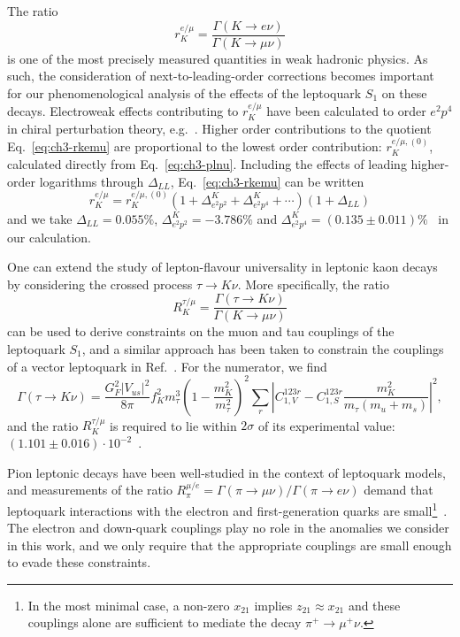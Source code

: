 The ratio
\begin{equation} \label{eq:ch3-rkemu}
  r_K^{e/\mu} = \frac{\Gamma(K \to e \nu)}{\Gamma(K \to \mu \nu)}
\end{equation}
is one of the most precisely measured quantities in weak hadronic physics. As
such, the consideration of next-to-leading-order corrections becomes important
for our phenomenological analysis of the effects of the leptoquark $S_{1}$ on
these decays. Electroweak effects contributing to $r_K^{e/\mu}$ have been
calculated to order $e^2p^4$ in chiral perturbation theory,
e.g.~\cite{Cirigliano:2007ga, Finkemeier:1994ev}. Higher order contributions to
the quotient Eq.~\eqref{eq:ch3-rkemu} are proportional to the lowest order
contribution: $r_K^{e/\mu, (0)}$, calculated directly from Eq.~\eqref{eq:ch3-plnu}.
Including the effects of leading higher-order logarithms through $\Delta_{LL}$,
Eq.~\eqref{eq:ch3-rkemu} can be written
\begin{equation}
  r_K^{e/\mu} = r_K^{e/\mu, (0)} \left( 1 + \Delta^K_{e^2 p^2} + \Delta^K_{e^2 p^4} + \cdots \right) \left( 1 + \Delta_{LL} \right)
\end{equation}
and we take $\Delta_{LL} = 0.055 \%$, $\Delta_{e^2 p^2}^K = -3.786 \%$ and
$\Delta_{e^2 p^4}^K = (0.135 \pm 0.011) \%$~\cite{Cirigliano:2007ga} in our
calculation.

One can extend the study of lepton-flavour universality in leptonic kaon decays
by considering the crossed process $\tau \to K \nu$. More specifically, the
ratio
\begin{equation}
  R_K^{\tau/\mu} = \frac{\Gamma(\tau \to K\nu)}{\Gamma(K \to \mu \nu)}
\end{equation}
can be used to derive constraints on the muon and tau couplings of the
leptoquark $S_{1}$, and a similar approach has been taken to constrain the
couplings of a vector leptoquark in Ref.~\cite{Fajfer:2015ycq}. For the
numerator, we find
\begin{equation}
  \Gamma(\tau \to K \nu) = \frac{G_F^2 |V_{us}|^2}{8 \pi} f_K^2 m_\tau^3 \left( 1 - \frac{m_K^2}{m_\tau^2} \right)^2 \sum_{r} \left| C_{1,V}^{123r}  - C_{1,S}^{123r} \frac{m_K^2}{m_\tau(m_u + m_s)} \right|^2,
\end{equation}
and the ratio $R_K^{\tau/\mu}$ is required to lie within $2\sigma$ of its
experimental value: $(1.101 \pm 0.016) \cdot 10^{-2}$~\cite{Olive:2016xmw}.

Pion leptonic decays have been well-studied in the context of leptoquark models,
and measurements of the ratio $R_\pi^{\mu/e} = \Gamma(\pi \to \mu
\nu)/\Gamma(\pi \to e \nu)$ demand that leptoquark interactions with the
electron and first-generation quarks are small\footnote{In the most minimal
  case, a non-zero $x_{2 1}$ implies $z_{2 1} \approx x_{2 1}$ and these
  couplings alone are sufficient to mediate the decay $\pi^+ \rightarrow \mu^+
  \nu$.}~\cite{Buchmuller:1986iq, Davidson:1993qk}. The electron and down-quark
couplings play no role in the anomalies we consider in this work, and we only
require that the appropriate couplings are small enough to evade these
constraints.


